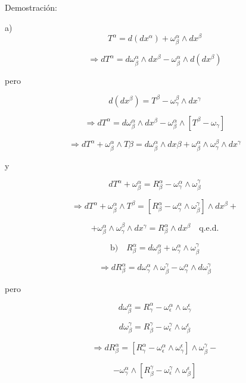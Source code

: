 \documentclass{report}
\begin{document}
{Demostración: 

a) \[T^{\alpha} = d (dx^{\alpha}) + \omega_{\beta}^{\alpha} \wedge dx^{\beta}\]

\[\Rightarrow dT^{\alpha} = d \omega _{\beta}^{\alpha} \wedge dx^{\beta} - \omega_{\beta}^{\alpha} \wedge d(dx^{\beta})\]

pero

\[d (dx^{\beta}) =T^{\beta} -\omega _{\gamma}^{\beta} \wedge dx^{\gamma}\]

\[\Rightarrow dT^{\alpha}= d\omega_{\beta}^{\alpha} \wedge dx^{\beta} - \omega_{\beta}^{\alpha} \wedge [T^{\beta} - \omega_{\gamma}]\]

\[\Rightarrow dT^{\alpha} + \omega _{\beta}^{\alpha} \wedge T \beta = d \omega _{\beta}^{\alpha } \wedge dx \beta + \omega_{\beta}^{\alpha} \wedge \omega _{\gamma}^{\beta} \wedge dx^{\gamma}\]

y

\[dT^{\alpha} + \omega _{\beta}^{\alpha} = R_{\beta}^{\alpha} - \omega _{\gamma}^{\alpha} \wedge \omega _{\beta}^{\gamma }\]

\[\Rightarrow dT^{\alpha} + \omega _{\beta}^{\alpha} \wedge T^{\beta} = [R_{\beta} ^{\alpha} - \omega_{\gamma} ^{\alpha} \wedge \omega _{\beta}^{\gamma}] \wedge dx^{\beta}+\]

\[+ \omega_{\beta}^{\alpha} \wedge \omega_{\gamma}^{\beta} \wedge dx^{\gamma} = R_{\beta}^{\alpha} \wedge dx^{\beta} \quad \text{q.e.d.}\]

\[\text{b)} \quad R_{\beta}^{\alpha} = d \omega _{\beta}^{\alpha} + \omega_{\gamma}^{\alpha} \wedge \omega _{\beta}^{\gamma} \]

\[\Rightarrow d R_{\beta}^{\alpha} =  d \omega_{\gamma}^{\alpha} \wedge \omega_{\beta}^{\gamma} - \omega_{\gamma}^{\alpha} \wedge d \omega _{\beta}^{\gamma}\]

pero

\[d \omega_{\beta}^{\alpha} = R_{\gamma}^{\alpha} - \omega _{\epsilon}^{\alpha} \wedge \omega _{\gamma}^{\epsilon } \]

\[d \omega_{\beta}^{\gamma} = R^{\gamma}_{\beta} - \omega _{\epsilon}^{\gamma} \wedge \omega _{\beta}^{\epsilon } \]


\[\Rightarrow d R_{\beta}^{\alpha} = [R_{\gamma}^{\alpha} - \omega _{\epsilon}^{\alpha} \wedge \omega _{\gamma}^{\epsilon}] \wedge \omega _{\beta}^{\gamma} -\]

\[- \omega_{\gamma}^{\alpha} \wedge [R_{\beta}^{\gamma} - \omega_{\epsilon}^{\gamma} \wedge \omega_{\beta}^{\epsilon}] \]

}
\end{document}
